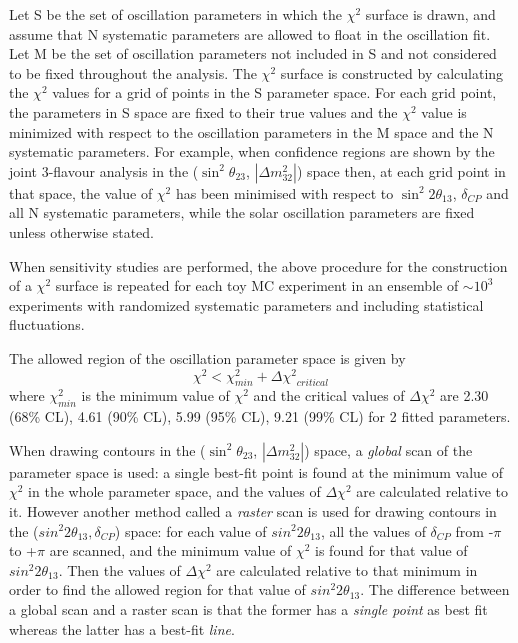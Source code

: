 Let S be the set of oscillation parameters in which the $\chi^{2}$ surface is drawn, and
assume that N systematic parameters are allowed to float in the oscillation fit.
Let M be the set of oscillation parameters not included in S and not considered to be fixed
throughout the analysis.
The $\chi^{2}$ surface is constructed by calculating the $\chi^{2}$ values for a grid of points 
in the S parameter space. For each grid point, 
the parameters in S space are fixed to their true values
and the $\chi^{2}$ value is minimized with respect to the oscillation parameters in the M space and 
the N systematic parameters.
For example, when confidence regions are shown by the joint 3-flavour analysis in 
the ($\sin^{2}\theta_{23}$, $|\Delta m^{2}_{32}|$) space then, at each grid point in that space,
the value of $\chi^{2}$ has been minimised with respect to $\sin^{2}2\theta_{13}$, $\delta_{CP}$
and all N systematic parameters, while the solar oscillation parameters are fixed unless otherwise
stated.

When sensitivity studies are performed, the above procedure for the construction of a $\chi^{2}$ surface
is repeated for each toy MC experiment in an ensemble of $\sim10^3$ experiments with
randomized systematic parameters and including statistical fluctuations.

The allowed region of the oscillation parameter space is given by
\begin{equation}
\displaystyle
\chi^{2} < \chi_{min}^{2} + \Delta{\chi^{2}}_{critical}
\label{eq:chiconfregion}
\end{equation}
where $\chi_{min}^{2}$ is the minimum value of $\chi^{2}$ and the critical values of $\Delta{\chi^{2}}$ are 
2.30 (68\% CL), 4.61 (90\% CL), 5.99 (95\% CL), 9.21 (99\% CL) for 2 fitted parameters.

When drawing contours in the ($\sin^{2}\theta_{23}$, $|\Delta m^{2}_{32}|$) space, a {\em global} scan of the 
parameter space is used: a single best-fit point is found at the minimum value of $\chi^{2}$ in the whole 
parameter space, and the values of $\Delta{\chi^{2}}$ are calculated relative to it. However another method 
called a {\em raster} scan is used for drawing contours in the ($sin^{2}2\theta_{13}, \delta_{CP}$) space: 
for each value of $sin^{2}2\theta_{13}$, all the values of $\delta_{CP}$ from -$\pi$ to +$\pi$ are scanned, 
and the minimum value of $\chi^{2}$ is found for that value of $sin^{2}2\theta_{13}$. Then the values of 
$\Delta{\chi^{2}}$ are calculated relative to that minimum in order to find the allowed region for that value 
of $sin^{2}2\theta_{13}$. The difference between a global scan and a raster scan is that the former has a 
{\em single point} as best fit whereas the latter has a best-fit {\em line}. 

